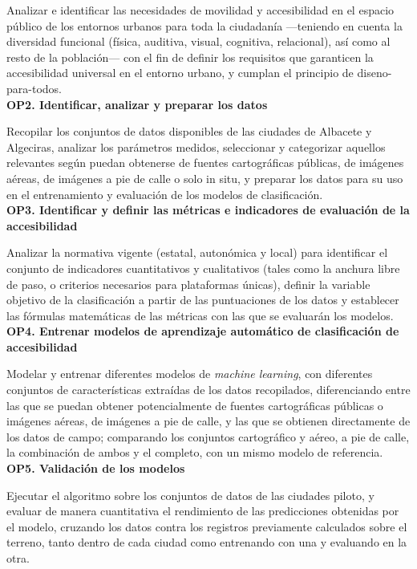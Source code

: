 Analizar e identificar las necesidades de movilidad y accesibilidad en el espacio público de los entornos urbanos para toda la ciudadanía —teniendo en cuenta la diversidad funcional (física, auditiva, visual, cognitiva, relacional), así como al resto de la población— con el fin de definir los requisitos que garanticen la accesibilidad universal en el entorno urbano, y cumplan el principio de \gls{diseno-para-todos}.
\\

\textbf{OP2. Identificar, analizar y preparar los datos}

Recopilar los conjuntos de datos disponibles de las ciudades de Albacete y Algeciras, analizar los parámetros medidos, seleccionar y categorizar aquellos relevantes según puedan obtenerse de fuentes cartográficas públicas, de imágenes aéreas, de imágenes a pie de calle o solo in situ, y preparar los datos para su uso en el entrenamiento y evaluación de los modelos de clasificación.
\\

\textbf{OP3. Identificar y definir las métricas e indicadores de evaluación de la accesibilidad}

Analizar la normativa vigente (estatal, autonómica y local) para identificar el conjunto de indicadores cuantitativos y cualitativos (tales como la anchura libre de paso, o criterios necesarios para plataformas únicas), definir la variable objetivo de la clasificación a partir de las puntuaciones de los datos y establecer las fórmulas matemáticas de las métricas con las que se evaluarán los modelos.
\\

\textbf{OP4. Entrenar modelos de aprendizaje automático de clasificación de accesibilidad}

Modelar y entrenar diferentes modelos de \textit{machine learning}, con diferentes conjuntos de características extraídas de los datos recopilados, diferenciando entre las que se puedan obtener potencialmente de fuentes cartográficas públicas o imágenes aéreas, de imágenes a pie de calle, y las que se obtienen directamente de los datos de campo; comparando los conjuntos cartográfico y aéreo, a pie de calle, la combinación de ambos y el completo, con un mismo modelo de referencia.
\\

\textbf{OP5. Validación de los modelos}

Ejecutar el algoritmo sobre los conjuntos de datos de las ciudades piloto, y evaluar de manera cuantitativa el rendimiento de las predicciones obtenidas por el modelo, cruzando los datos contra los registros previamente calculados sobre el terreno, tanto dentro de cada ciudad como entrenando con una y evaluando en la otra.
\\

